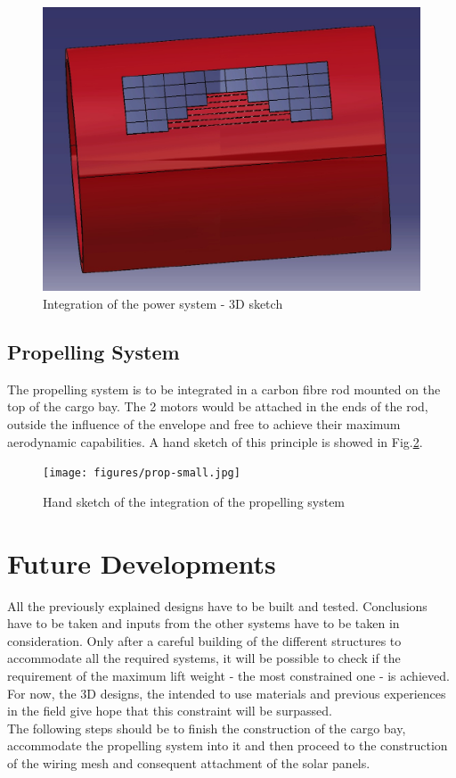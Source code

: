 \begin{figure}[bht]
\centering
\includegraphics[scale=0.5]{figures/mesh.jpg}
\caption{Integration of the power system - 3D sketch}
\label{fig:mesh}
\end{figure}


\subsection{Propelling System}

The propelling system is to be integrated in a carbon fibre rod mounted on the top of the cargo bay. The 2 motors would be attached in the ends of the rod, outside the influence of the envelope and free to achieve their maximum aerodynamic capabilities. A hand sketch of this principle is showed in Fig.\ref{fig:prop}.

\begin{figure}[bht]
\centering
\texttt{[image: figures/prop-small.jpg]}
\caption{Hand sketch of the integration of the propelling system}
\label{fig:prop}
\end{figure}

\section{Future Developments}

All the previously explained designs have to be built and tested. Conclusions have to be taken and inputs from the other systems have to be taken in consideration. Only after a careful building of the different structures to accommodate all the required systems, it will be possible to check if the requirement of the maximum lift weight - the most constrained one - is achieved. For now, the 3D designs, the intended to use materials and previous experiences in the field give hope that this constraint will be surpassed. \\
The following steps should be to finish the construction of the cargo bay, accommodate the propelling system into it and then proceed to the construction of the wiring mesh and consequent attachment of the solar panels.

